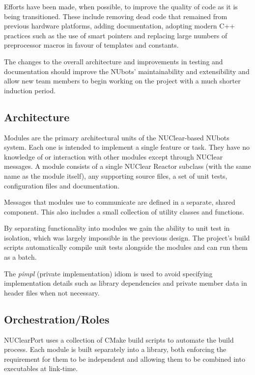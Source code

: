 \documentclass[english,12pt]{scrartcl}
\begin{document}
		Efforts have been made, when possible, to improve the quality of code as it is being
		transitioned. These include removing dead code that remained from previous hardware
		platforms, adding documentation, adopting modern C++ practices such as the use of smart
		pointers and replacing large numbers of preprocessor macros in favour of templates and
		constants.
		
		The changes to the overall architecture and improvements in testing and documentation
		should improve the NUbots' maintainability and extensibility and allow new team members
		to begin working on the project with a much shorter induction period.
		

		\subsection{Architecture}
			Modules are the primary architectural units of the NUClear-based NUbots system. Each
			one is intended to implement a single feature or task. They have no knowledge of or
			interaction with other modules except through NUClear messages. A module consists of
			a single NUClear Reactor subclass (with the same name as the module itself), any
			supporting source files, a set of unit tests, configuration files and documentation.
			
			Messages that modules use to communicate are defined in a separate, shared component.
			This also includes a small collection of utility classes and functions.
			
			By separating functionality into modules we gain the ability to unit test in isolation,
			which was largely impossible in the previous design. The project's build scripts
			automatically compile unit tests alongside the modules and can run them as a batch.
			
			The \emph{pimpl} (private implementation) idiom is used to avoid specifying
			implementation details such as library dependencies and private member data in header
			files when not necessary.
			
			
		\subsection{Orchestration/Roles}
			NUClearPort uses a collection of CMake build scripts to automate the build process.
			Each module is built separately into a library, both enforcing the requirement for
			them to be independent and allowing them to be combined into executables at
			link-time.
			
\end{document}
